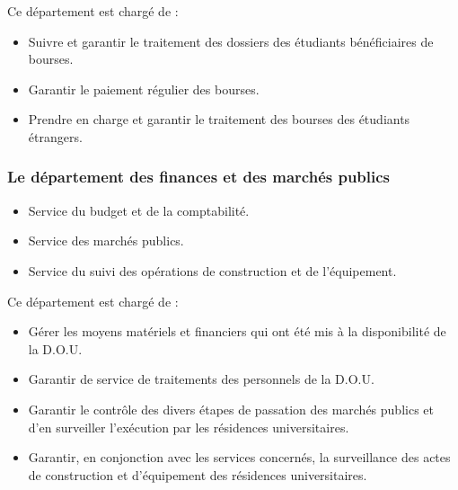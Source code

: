 Ce département est chargé de :
\begin{itemize}\renewcommand{\labelitemi}{$\bullet$}
    \item Suivre et garantir le traitement des dossiers des étudiants bénéficiaires de bourses.
    \item Garantir le paiement régulier des bourses.
    \item Prendre en charge et garantir le traitement des bourses des étudiants étrangers.
\end{itemize}

\subsubsection{Le département des finances et des marchés publics}
\begin{itemize}
    \item Service du budget et de la comptabilité.
    \item Service des marchés publics.
    \item Service du suivi des opérations de construction et de l'équipement.\\
\end{itemize}

Ce département est chargé de :
\begin{itemize}\renewcommand{\labelitemi}{$\bullet$}
    \item Gérer les moyens matériels et financiers qui ont été mis à la disponibilité de la \acs{D.O.U}.
    \item Garantir de service de traitements des personnels de la \acs{D.O.U}.
    \item Garantir le contrôle des divers étapes de passation des marchés publics et d'en surveiller l'exécution par les résidences universitaires.
    \item Garantir, en conjonction avec les services concernés, la surveillance des actes de construction et d'équipement des résidences universitaires.\\
\end{itemize}


